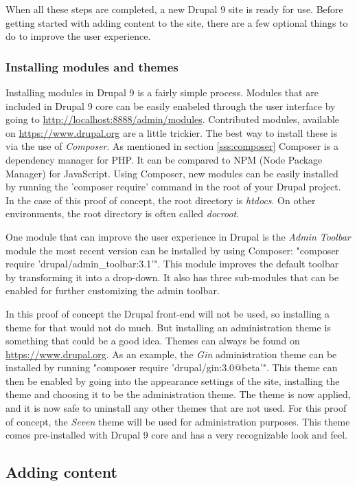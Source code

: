 When all these steps are completed, a new Drupal 9 site is ready for use. Before getting started with adding content to the site, there are a few optional things to do to improve the user experience.

\subsubsection{Installing modules and themes}

Installing modules in Drupal 9 is a fairly simple process. Modules that are included in Drupal 9 core can be easily enabeled through the user interface by going to \url{http://localhost:8888/admin/modules}. Contributed modules, available on \url{https://www.drupal.org} are a little trickier. The best way to install these is via the use of \emph{Composer}. As mentioned in section \ref{sss:composer} Composer is a dependency manager for PHP. It can be compared to NPM (Node Package Manager) for JavaScript. Using Composer, new modules can be easily installed by running the 'composer require' command in the root of your Drupal project. In the case of this proof of concept, the root directory is \emph{htdocs}. On other environments, the root directory is often called \emph{docroot}.

One module that can improve the user experience in Drupal is the \emph{Admin Toolbar}
module the most recent version can be installed by using Composer: "composer require 'drupal/admin\_toolbar:3.1'". This module improves the default toolbar by transforming it into a  drop-down. It also has three sub-modules that can be enabled for further customizing the admin toolbar.

In this proof of concept the Drupal front-end will not be used, so installing a theme for that would not do much. But installing an administration theme is something that could be a good idea. Themes can always be found on \url{https://www.drupal.org}. As an example, the \emph{Gin} administration theme can be installed by running "composer require 'drupal/gin:3.0@beta'". This theme can then be enabled by going into the appearance settings of the site, installing the theme and choosing it to be the administration theme. The theme is now applied, and it is now safe to uninstall any other themes that are not used. For this proof of concept, the \emph{Seven} theme will be used for administration purposes. This theme comes pre-installed with Drupal 9 core and has a very recognizable look and feel.

\subsection{Adding content}


